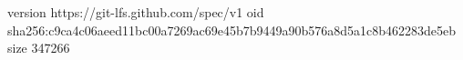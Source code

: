 version https://git-lfs.github.com/spec/v1
oid sha256:c9ca4c06aeed11bc00a7269ac69e45b7b9449a90b576a8d5a1c8b462283de5eb
size 347266
